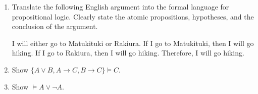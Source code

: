 \documentclass[11pt]{report}
\begin{document}
\begin{enumerate}
	\item Translate the following English argument into the formal language for propositional logic. Clearly state the atomic propositions, hypotheses, and the conclusion of the argument. 
	
	\vspace{0.5cm}

	I will either go to Matukituki or Rakiura. If I go to Matukituki, then I will go hiking. If I go to Rakiura, then I will go hiking. Therefore, I will go hiking. 
	
	\vspace{3cm}

	\item Show $\{A \lor B, A\rightarrow C, B \rightarrow C\} \models C.$ 
	
	\vspace{3cm}
	
	\item Show $\models A \lor \lnot A$.
	
	\vspace{3cm}
	
	
	
\end{enumerate} 
\end{document}
